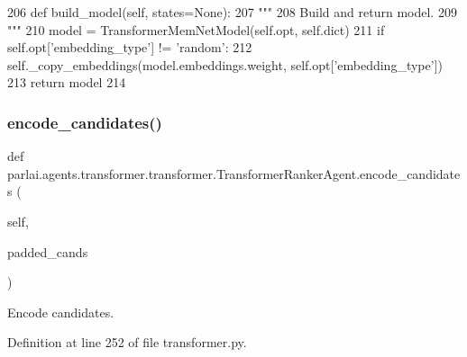 \begin{DoxyCode}
206     \textcolor{keyword}{def }build\_model(self, states=None):
207         \textcolor{stringliteral}{"""}
208 \textcolor{stringliteral}{        Build and return model.}
209 \textcolor{stringliteral}{        """}
210         model = TransformerMemNetModel(self.opt, self.dict)
211         \textcolor{keywordflow}{if} self.opt[\textcolor{stringliteral}{'embedding\_type'}] != \textcolor{stringliteral}{'random'}:
212             self.\_copy\_embeddings(model.embeddings.weight, self.opt[\textcolor{stringliteral}{'embedding\_type'}])
213         \textcolor{keywordflow}{return} model
214 
\end{DoxyCode}
\mbox{\label{classparlai_1_1agents_1_1transformer_1_1transformer_1_1TransformerRankerAgent_a6067345dff7fefda2809ea3bd63cd8fd}} 
\subsubsection{\texorpdfstring{encode\+\_\+candidates()}{encode\_candidates()}}
{\footnotesize\ttfamily def parlai.\+agents.\+transformer.\+transformer.\+Transformer\+Ranker\+Agent.\+encode\+\_\+candidates (\begin{DoxyParamCaption}\item[{}]{self,  }\item[{}]{padded\+\_\+cands }\end{DoxyParamCaption})}

\begin{DoxyVerb}Encode candidates.
\end{DoxyVerb}
 

Definition at line 252 of file transformer.\+py.


